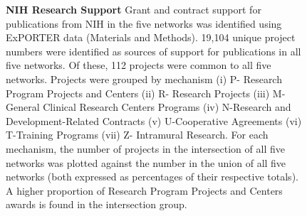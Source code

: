 \documentclass[10pt,letterpaper]{article}
\begin{document}
\begin{figure}[!h]
\begin{adjustwidth}{-0.5in}{0in} %
\centering
\caption{{\bf NIH Research Support} Grant and contract support for publications from NIH in the five networks was identified using ExPORTER data (Materials and Methods). 19,104 unique project numbers were identified as sources of support for publications in all five networks. Of these, 112 projects were common to all five networks. Projects were grouped by mechanism (i) P-  Research Program Projects and Centers (ii) R- Research Projects (iii) M-General Clinical Research Centers Programs (iv) N-Research and Development-Related Contracts (v) U-Cooperative Agreements (vi) T-Training Programs (vii) Z- Intramural Research. For each mechanism, the number of projects in the intersection of all five networks was plotted against the number in the union of all five networks (both expressed as percentages of their respective totals). A higher proportion of Research Program Projects and Centers awards is found in the intersection group.}
\label{fig3}
\end{adjustwidth}
\end{figure}
\end{document}
